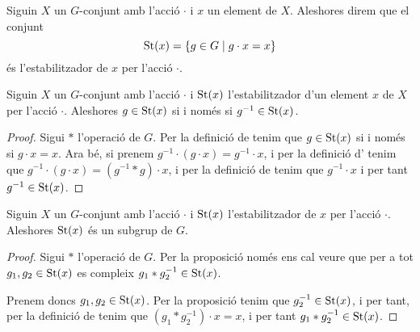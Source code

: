 \documentclass[../Apunts.tex]{subfiles}
\begin{document}
	\begin{definition}
		\label{def:l'estabilitzador d'un element per una acció}
		Siguin \(X\) un \(G\)-conjunt amb l'acció \(\cdot\) i \(x\) un element de \(X\). Aleshores direm que el conjunt
		\[\operatorname{St}(x)=\{g\in G\mid g\cdot x=x\}\]
		és l'estabilitzador de \(x\) per l'acció \(\cdot\).
	\end{definition}
	\begin{proposition}
		\label{prop:l'invers d'un element pertany a l'estabilitzador per una acció}
		Siguin \(X\) un \(G\)-conjunt amb l'acció \(\cdot\) i \(\operatorname{St}(x)\) l'estabilitzador d'un element \(x\) de \(X\) per l'acció \(\cdot\). Aleshores \(g\in\operatorname{St}(x)\) si i només si \(g^{-1}\in\operatorname{St}(x)\).
		\begin{proof}
			Sigui \(\ast\) l'operació de \(G\). Per la definició de  tenim que \(g\in\operatorname{St}(x)\) si i només si \(g\cdot x=x\). Ara bé, si prenem \(g^{-1}\cdot (g\cdot x)=g^{-1}\cdot x\), i per la definició d' tenim que \(g^{-1}\cdot(g\cdot x)=(g^{-1}\ast g)\cdot x\), i per la definició de  tenim que \(g^{-1}\cdot x\) i per tant \(g^{-1}\in\operatorname{St}(x)\).
		\end{proof}
	\end{proposition}
	\begin{proposition}
		\label{prop:l'estabilitzador és un subgrup}
		Siguin \(X\) un \(G\)-conjunt amb l'acció \(\cdot\) i \(\operatorname{St}(x)\) l'estabilitzador de \(x\) per l'acció \(\cdot\). Aleshores \(\operatorname{St}(x)\) és un subgrup de \(G\).
		\begin{proof}
			Sigui \(\ast\) l'operació de \(G\). Per la proposició  només ens cal veure que per a tot \(g_{1},g_{2}\in\operatorname{St}(x)\) es compleix \(g_{1}\ast g_{2}^{-1}\in\operatorname{St}(x)\).
			
			Prenem doncs \(g_{1},g_{2}\in\operatorname{St}(x)\). Per la proposició  tenim que \(g_{2}^{-1}\in\operatorname{St}(x)\), i per tant, per la definició de  tenim que \((g_{1}\ast g_{2}^{-1})\cdot x=x\), i per tant \(g_{1}\ast g_{2}^{-1}\in\operatorname{St}(x)\).
		\end{proof}
	\end{proposition}
\end{document}
